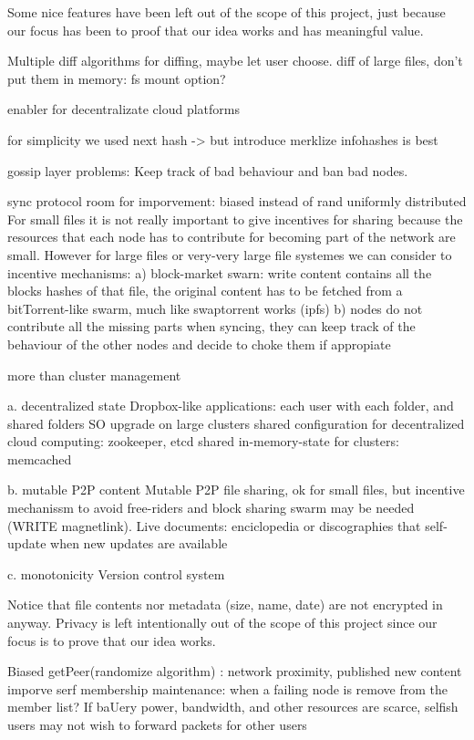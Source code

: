 \documentclass{sig-alternate}
\begin{document}
Some nice features have been left out of the scope of this project, just because our focus has been to proof that our idea works and has meaningful value.

Multiple diff algorithms for diffing, maybe let user choose.
diff of large files, don't put them in memory: fs mount option?

enabler for decentralizate cloud platforms

for simplicity we used next hash -> but introduce merklize infohashes is best

gossip layer problems: Keep track of bad behaviour and ban bad nodes.

sync protocol room for imporvement: biased instead of rand uniformly distributed
For small files it is not really important to give incentives for sharing because the resources that each node has to contribute for becoming part of the network are small. However for large files or very-very large file systemes we can consider to incentive mechanisms:
    a) block-market swarn: write content contains all the blocks hashes of that file, the original content has to be fetched from a bitTorrent-like swarm, much like swaptorrent works (ipfs)
    b) nodes do not contribute all the missing parts when syncing, they can keep track of the behaviour of the other nodes and decide to choke them if appropiate

more than cluster management

a. decentralized state
    Dropbox-like applications: each user with each folder, and shared folders
    SO upgrade on large clusters
    shared configuration for decentralized cloud computing: zookeeper, etcd
    shared in-memory-state for clusters: memcached

b. mutable P2P content
    Mutable P2P file sharing, ok for small files, but incentive mechanissm to avoid free-riders and block sharing swarm may be needed (WRITE magnetlink).
    Live documents: enciclopedia or discographies that self-update when new updates are available

c. monotonicity
    Version control system

Notice that file contents nor metadata (size, name, date) are not encrypted in anyway. Privacy is left intentionally out of the scope of this project since our focus is to prove that our idea works. 


Biased getPeer(randomize algorithm) : network proximity, published new content
imporve serf membership maintenance: when a failing node is remove from the member list?
If baUery power, bandwidth, and other resources are scarce, selfish users may not wish to forward packets for other users
\end{document}

